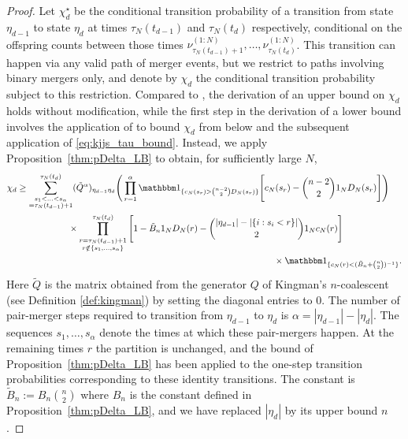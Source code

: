 \begin{proof}
Let $\chi^\star_d$ be the conditional transition probability of a transition from state $\eta_{d-1}$ to state $\eta_d$ at times $\tau_N(t_{d-1})$ and $\tau_N(t_d)$ respectively, conditional on the offspring counts between those times $\nu^{(1:N)}_{\tau_N(t_{d-1}) +1} , \dots, \nu^{(1:N)}_{\tau_N(t_d)}$. 
This transition can happen via any valid path of merger events, but we restrict to paths involving binary mergers only, and denote by $\chi_d$ the conditional transition probability subject to this restriction.
Compared to \textcite[Proof of Theorem 1]{koskela2018}, the derivation of an upper bound on $\chi_d$ holds without modification, while the first step in the derivation of a lower bound \parencite[p.14]{koskela2018} involves the application of \textcite[Lemma 1 Case 1]{koskela2018} to bound $\chi_d$ from below and the subsequent application of \eqref{eq:kjjs_tau_bound}.
Instead, we apply Proposition~\ref{thm:pDelta_LB} to obtain, for sufficiently large $N$,
\begin{align*}
\chi_d 
&\geq \sum_{\substack{ s_1 < \ldots < s_{ \alpha } 
        \\= \tau_N( t_{ d - 1 } ) + 1 }}^{ \tau_N( t_d ) } 
        ( \tilde{ Q }^{ \alpha } )_{ \eta_{ d - 1 } \eta_d } 
        \Bigg( \prod_{ r = 1 }^{ \alpha } \I{ c_N(s_r) > \binom{n-2}{2} D_N(s_r) }
        \Bigg[ c_N( s_r ) - \binom{ n - 2 }{ 2 } \ON D_N( s_r ) \Bigg] \Bigg) \\
    &\hspace{2cm} \times \prod_{ \substack{ r = \tau_N( t_{ d - 1 } ) + 1 
        \\ r \notin \{ s_1, \ldots, s_\alpha \} }}^{ \tau_N( t_d ) } 
        \Bigg[ 1 - \tilde{B}_n \ON D_N( r ) 
        - \binom{ | \eta_{ d - 1 } | - | \{ i : s_i < r \} | }{ 2 } \ON c_N( r ) \Bigg] \\
    &\hspace{10cm}\times \I{ c_N(r) < (\tilde{B}_n + \binom{n}{2})^{-1} } .
\end{align*}
Here $\tilde{Q}$ is the matrix obtained from the generator $Q$ of Kingman's $n$-coalescent (see Definition \ref{def:kingman}) by setting the diagonal entries to 0.
The number of pair-merger steps required to transition from $\eta_{d-1}$ to $\eta_d$ is $\alpha = |\eta_{d-1}| - |\eta_d|$. The sequences $s_1,\dots,s_\alpha$ denote the times at which these pair-mergers happen. 
At the remaining times $r$ the partition is unchanged, and the bound of Proposition~\ref{thm:pDelta_LB} has been applied to the one-step transition probabilities corresponding to these identity transitions. 
The constant is $\tilde{B}_n := B_n\binom{n}{2}$ where $B_n$ is the constant defined in Proposition~\ref{thm:pDelta_LB}, and we have replaced $|\eta_d|$ by its upper bound $n$.


\end{proof}

